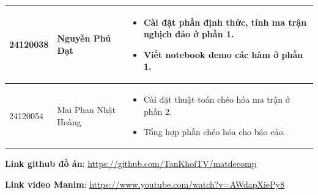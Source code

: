 \begin{table}[H]
\begin{tabular}{|p{2cm}|p{4cm}|p{10cm}|}
        24120038 & Nguyễn Phú Đạt &
        \vspace{-0.5\baselineskip}
        \begin{itemize}[itemsep=0pt, topsep=0pt, partopsep=0pt, parsep=0pt]
            \item Cài đặt phần định thức, tính ma trận nghịch đảo ở phần 1.
            \item Viết notebook demo các hàm ở phần 1.
        \end{itemize} \\ \hline

        24120054 & Mai Phan Nhật Hoàng &
        \vspace{-0.5\baselineskip}
        \begin{itemize}[itemsep=0pt, topsep=0pt, partopsep=0pt, parsep=0pt]
            \item Cài đặt thuật toán chéo hóa ma trận ở phần 2.
            \item Tổng hợp phần chéo hóa cho báo cáo.
        \end{itemize} \\ \hline
    \end{tabular}
\end{table}

\vspace{2cm}

\noindent\textbf{Link github đồ án}: \url{https://github.com/TanKhoiTV/matdecomp}

\noindent\textbf{Link video Manim}: \url{https://www.youtube.com/watch?v=AWdapXiePy8}